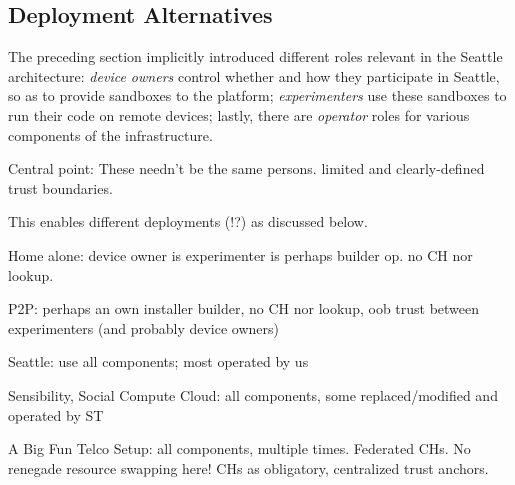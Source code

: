 \subsection{Deployment Alternatives}

The preceding section implicitly introduced different roles relevant
in the Seattle architecture:
\textit{device owners} control whether and how they participate
in Seattle, so as to provide sandboxes to the platform;
\textit{experimenters} use these sandboxes to run their code
on remote devices;
lastly, there are \textit{operator} roles for various components
of the infrastructure.

Central point: These needn't be the same persons.
limited and clearly-defined trust boundaries.

This enables different deployments (!?) as discussed below.


Home alone: device owner is experimenter is perhaps builder op.
no CH nor lookup.

P2P: perhaps an own installer builder, no CH nor lookup,
oob trust between experimenters (and probably device owners)

Seattle: use all components; most operated by us

Sensibility, Social Compute Cloud: all components, some replaced/modified
and operated by ST

A Big Fun Telco Setup: all components, multiple times. Federated CHs.
No renegade resource swapping here! CHs as obligatory, centralized trust
anchors.
